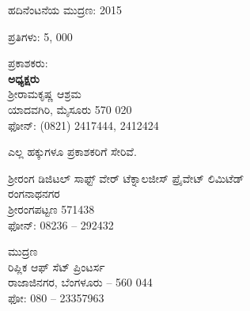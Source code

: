 

\begin{flushleft}
ಹದಿನೆಂಟನೆಯ ಮುದ್ರಣ: 2015
\end{flushleft}

\vfill

\begin{flushleft}
ಪ್ರತಿಗಳು: 5, 000
\end{flushleft}

\vfill

\begin{flushleft}
ಪ್ರಕಾಶಕರು:\\\textbf{ಅಧ್ಯಕ್ಷರು}\\ಶ‍್ರೀರಾಮಕೃಷ್ಣ ಆಶ್ರಮ\\ಯಾದವಗಿರಿ, ಮೈಸೂರು 570 020\\ಫೋನ್​: (0821) 2417444, 2412424
\end{flushleft}

\vfill

\begin{flushleft}
 ಎಲ್ಲ ಹಕ್ಕುಗಳೂ ಪ್ರಕಾಶಕರಿಗೆ ಸೇರಿವೆ.
\end{flushleft}

\vfill

\begin{flushleft}
ಶ‍್ರೀರಂಗ ಡಿಜಿಟಲ್ ಸಾಫ್ಟ್ ‍ವೇರ್ ಟೆಕ್ನಾಲಜೀಸ್ ಪ್ರೈವೇಟ್ ಲಿಮಿಟೆಡ್\\ರಂಗನಾಥನಗರ\\ಶ‍್ರೀರಂಗಪಟ್ಟಣ 571438\\ಫೋನ್​: 08236 – 292432
\end{flushleft}

\vfill

\begin{flushleft}
ಮುದ್ರಣ\\ರಿಪ್ಲಿಕ ಆಫ್ ಸೆಟ್ ಪ್ರಿಂಟರ್ಸ\\ರಾಜಾಜಿನಗರ, ಬೆಂಗಳೂರು – 560 044\\ಫೋ: 080 – 23357963
\end{flushleft}

